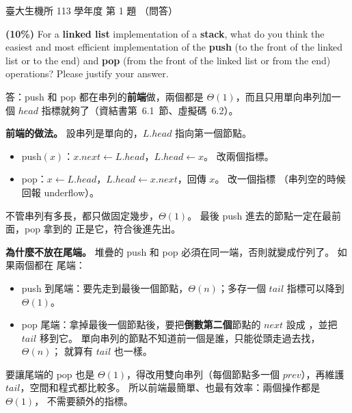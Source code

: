 \begin{pastexam}[label={px:ntu-113-bme-ds-01}]{臺大生機所 113 學年度 第 1 題}
（問答）

\textbf{(10\%)} For a \textbf{linked list} implementation of a \textbf{stack}, what do you think the
easiest and most efficient implementation of the \textbf{push} (to the front of the linked list or to
the end) and \textbf{pop} (from the front of the linked list or from the end) operations? Please
justify your answer.
\end{pastexam}

\begin{pastsoln}
答：push 和 pop 都在串列的\textbf{前端}做，兩個都是 $\Theta(1)$，而且只用單向串列加一個
$\mathit{head}$ 指標就夠了（資結書第~6.1~節、虛擬碼~6.2）。

\textbf{前端的做法。} 設串列是單向的，$L.\mathit{head}$ 指向第一個節點。
\begin{itemize}
\item push$(x)$：$x.\mathit{next} \gets L.\mathit{head}$，$L.\mathit{head} \gets x$。 改兩個指標。
\item pop：$x \gets L.\mathit{head}$，$L.\mathit{head} \gets x.\mathit{next}$，回傳 $x$。 改一個指標
（串列空的時候回報 underflow）。
\end{itemize}
不管串列有多長，都只做固定幾步，$\Theta(1)$。 最後 push 進去的節點一定在最前面，pop 拿到的
正是它，符合後進先出。

\textbf{為什麼不放在尾端。} 堆疊的 push 和 pop 必須在同一端，否則就變成佇列了。 如果兩個都在
尾端：
\begin{itemize}
\item push 到尾端：要先走到最後一個節點，$\Theta(n)$；多存一個 $\mathit{tail}$ 指標可以降到
$\Theta(1)$。
\item pop 尾端：拿掉最後一個節點後，要把\textbf{倒數第二個}節點的 $\mathit{next}$ 設成 \NIL，並把
$\mathit{tail}$ 移到它。 單向串列的節點不知道前一個是誰，只能從頭走過去找，$\Theta(n)$；
就算有 $\mathit{tail}$ 也一樣。
\end{itemize}
要讓尾端的 pop 也是 $\Theta(1)$，得改用雙向串列（每個節點多一個 $\mathit{prev}$），再維護
$\mathit{tail}$，空間和程式都比較多。 所以前端最簡單、也最有效率：兩個操作都是 $\Theta(1)$，
不需要額外的指標。
\end{pastsoln}
